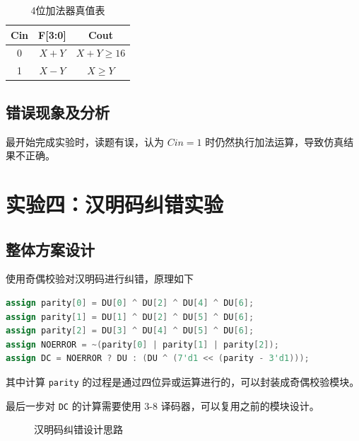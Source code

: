 \documentclass[12pt, a4paper]{ctexart}
\begin{document}
\begin{table}[H]
    \centering
    \begin{tabular}{|c|c|c|}
        \hline
        Cin & F[3:0] & Cout \\
        \hline
        0 & $X+Y$ & $X+Y\ge16$ \\
        1 & $X-Y$ & $X\ge Y$ \\
        \hline
    \end{tabular}
    \caption{4位加法器真值表}
\end{table}

\subsection{错误现象及分析}

最开始完成实验时，读题有误，认为 $Cin=1$ 时仍然执行加法运算，导致仿真结果不正确。

\section{实验四：汉明码纠错实验}

\subsection{整体方案设计}

使用奇偶校验对汉明码进行纠错，原理如下

\begin{lstlisting}[language=Verilog, caption={汉明码纠错原理}]
assign parity[0] = DU[0] ^ DU[2] ^ DU[4] ^ DU[6];
assign parity[1] = DU[1] ^ DU[2] ^ DU[5] ^ DU[6];
assign parity[2] = DU[3] ^ DU[4] ^ DU[5] ^ DU[6];
assign NOERROR = ~(parity[0] | parity[1] | parity[2]);
assign DC = NOERROR ? DU : (DU ^ (7'd1 << (parity - 3'd1)));
\end{lstlisting}

其中计算 \lstinline|parity| 的过程是通过四位异或运算进行的，可以封装成奇偶校验模块。

最后一步对 \lstinline|DC| 的计算需要使用 3-8 译码器，可以复用之前的模块设计。

\begin{figure}[H]
    \centering
    \caption{汉明码纠错设计思路}
\end{figure}
\end{document}
